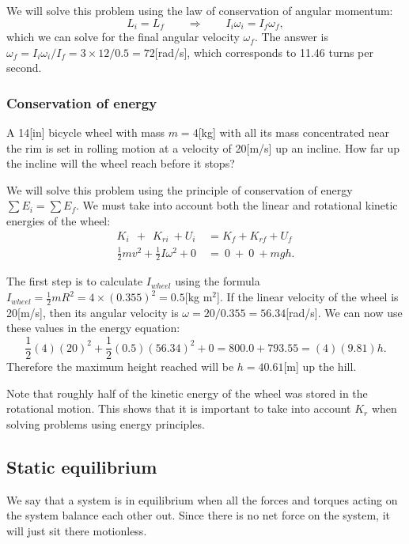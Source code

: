 \documentclass[letterpaper,9pt,journal]{IEEEtran}
\begin{document}
We will solve this problem using the law of conservation of angular momentum:
\[
  L_i = L_f \qquad \Rightarrow \qquad I_i\omega_i = I_f \omega_f,
\]
which we can solve for the final angular velocity $\omega_f$.
The answer is $\omega_f = I_i\omega_i/I_f= 3\times 12/0.5=72$[rad/s],
which corresponds to 11.46 turns per second. 


\subsubsection{Conservation of energy}

A 14[in] bicycle wheel with mass $m=4$[kg] with all its mass concentrated
near the rim is set in rolling motion at a velocity of 20[m/s] up an incline.
How far up the incline will the wheel reach before it stops?

We will solve this problem using the principle of conservation of energy
$\sum E_i = \sum E_f$. We must take into account both the linear and rotational 
kinetic energies of the wheel:
\begin{align*}
  K_i \ \ + \ \ K_{ri} \ + U_i  & =   K_f + K_{rf} + U_f \\
  \frac{1}{2}mv^2 + \frac{1}{2}I\omega^2 + 0 \ 	& =  \ 0 \ + \ 0 \ + mgh.
\end{align*}

The first step is to calculate $I_{wheel}$ using the formula
$I_{wheel} = \frac{1}{2}mR^2 = 4 \times (0.355)^2=0.5$[kg m$^2$].
If the linear velocity of the wheel is 20[m/s], then its
angular velocity is $\omega=20/0.355=56.34$[rad/s].
We can now use these values in the energy equation:
\[
 \frac{1}{2}(4)(20)^2 + \frac{1}{2}(0.5)(56.34)^2 + 0 
 = 800.0 + 793.55 = (4)(9.81)h.
\]
Therefore the maximum height reached will be $h=40.61$[m] up the hill.

Note that roughly half of the kinetic energy of the wheel was stored in the 
rotational motion. This shows that it is important to take into account $K_r$
when solving problems using energy principles. 


\subsection{Static equilibrium}
\label{a264232f7983ac829a790f4573f9fe59}%

We say that a system is in equilibrium when all the forces and torques
acting on the system balance each other out. Since there is no net force
on the system, it will just sit there motionless.
\end{document}
